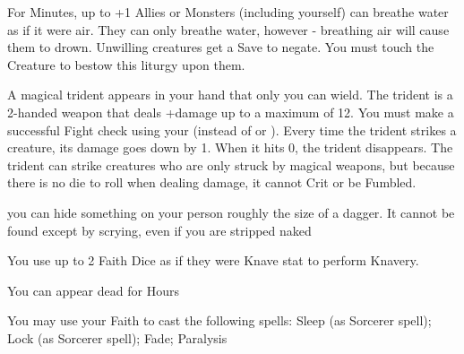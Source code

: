 {For \SUMDICE Minutes, up to \DICE+1 Allies or Monsters (including yourself) can breathe water as if it were air.  They can only breathe water, however - breathing air will cause them to drown. Unwilling creatures get a Save to negate.  You must touch the Creature to bestow this liturgy upon them. 
\LITURGY [
  Name= Trident of Ik'tik'buboe,
  Link=ikitikbubuoe-liturgy-trident,
  Paradigm= Force ,
  Save=  N ,
  Duration= Session ,
  Counter=  n/a  ,
  Keywords= None ,
  Target=   Self
]



A magical trident appears in your hand that only you can wield.  The trident is a 2-handed weapon that deals \DICE+\DICE damage up to a maximum of 12. You must make a successful Fight check using your \FOC (instead of \VIG or \DEX). Every time the trident strikes a creature, its damage goes down by 1.  When it hits 0, the trident disappears.  The trident can strike creatures who are only struck by magical weapons, but because there is no die to roll when dealing damage, it cannot Crit or be Fumbled. 



\GOD[
Name=Loki,
Link=small-god-loki,
GodOf=King of Thieves,
Holy=an image of two snakes circling one another to form an 'S' shape and biting the tail of the other
]


you can hide something on your person roughly the size of a dagger. It cannot be found except by scrying, even if you are stripped naked


You use up to 2 Faith Dice as if they were Knave {stat} to perform Knavery.




\GOD[
Name=Nyx,
Link=small-god-nyx,
GodOf=Cousin of Death,
Holy=a black lace shroud
]


You can appear dead for Hours


You may use your Faith to cast the following spells: Sleep (as Sorcerer spell); Lock (as Sorcerer spell); Fade; Paralysis

\LITURGY [
  Name= Fade,
  Link= nyx-liturgy-fade,
  Paradigm= Mind ,
  Save=  Y (negates) ,
  Duration= Markovian ,
  Counter=  n/a  ,
  Keywords= None ,
  Target=   Nearby creature or object
]



}
